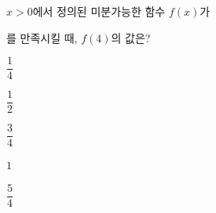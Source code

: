 \hspace*{2mm}\begin{minipage}[t]{\dimexpr\linewidth-2mm\relax}\vspace{0pt}
$x>0$에서 정의된 미분가능한 함수 $f(x)$가 \par\smallskip{}\par\smallskip\noindent 를 만족시킬 때, $f(4)$의 값은? 
\begin{choices32}{\rule[-3ex]{0pt}{8ex}$\dfrac{1}{4}$}{\rule[-3ex]{0pt}{8ex}$\dfrac{1}{2}$}{\rule[-3ex]{0pt}{8ex}$\dfrac{3}{4}$}{\rule[-3ex]{0pt}{8ex}$1$}{\rule[-3ex]{0pt}{8ex}$\dfrac{5}{4}$}\end{choices32}\end{minipage}
